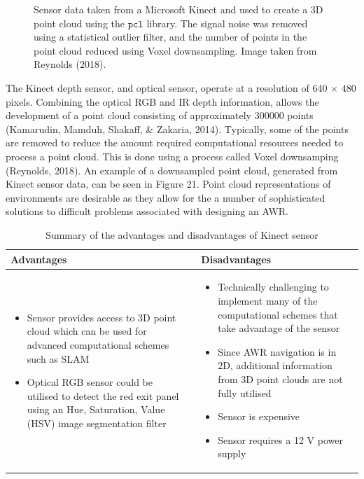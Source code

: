 \documentclass[a4paper]{article}
\begin{document}
\begin{figure}[h]
\begin{minipage}{0.45\textwidth}
\caption{Sensor data taken from a Microsoft Kinect and used to create a 3D point cloud using the $\texttt{pcl}$ library. The signal noise was removed using a statistical outlier filter, and the number of points in the point cloud reduced using Voxel downsampling. Image taken from Reynolds (2018).}
\end{minipage}
\end{figure}

The Kinect depth sensor, and optical sensor, operate at a resolution of 640 $\times$ 480 pixels. Combining the optical RGB and IR depth information, allows the development of a point cloud consisting of approximately 300000 points (Kamarudin, Mamduh, Shakaff, \& Zakaria, 2014). Typically, some of the points are removed to reduce the amount required computational resources needed to process a point cloud. This is done using a process called Voxel downsamping (Reynolds, 2018). An example of a downsampled point cloud, generated from Kinect sensor data, can be seen in Figure 21. Point cloud representations of environments are desirable as they allow for the a number of sophisticated solutions to difficult problems associated with designing an AWR.

\begin{table}[h]
\centering
\caption{Summary of the advantages and disadvantages of Kinect sensor} \footnotesize
\begin{tabular}{p{7.5cm}p{0.1cm}p{7.5cm}}
\toprule
\textbf{Advantages} & & \textbf{Disadvantages}\\
\midrule
\begin{itemize}[leftmargin=0.3cm] \item Sensor provides access to 3D point cloud which can be used for advanced computational schemes such as SLAM \item Optical RGB sensor could be utilised to detect the red exit panel using an Hue, Saturation, Value (HSV) image segmentation filter \end{itemize} & & \begin{itemize}[leftmargin=0.3cm] \item Technically challenging to implement many of the computational schemes that take advantage of the sensor \item Since AWR navigation is in 2D, additional information from 3D point clouds are not fully utilised \item Sensor is expensive \item Sensor requires a 12 $\si{\volt}$ power supply\end{itemize}\\
\bottomrule
\end{tabular}
\end{table}
\end{document}
